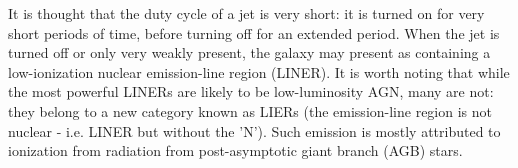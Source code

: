 		It is thought that the duty cycle of a jet is very short: it is turned on for very short periods of time, before turning off for an extended period. When the jet is turned off or only very weakly present, the galaxy may present as containing a low-ionization nuclear emission-line region (LINER). It is worth noting that while the most powerful LINERs are likely to be low-luminosity AGN, many are not: they belong to a new category known as LIERs (the emission-line region is not nuclear - i.e. LINER but without the 'N'). Such emission is mostly attributed to ionization from radiation from post-asymptotic giant branch (AGB) stars. 



